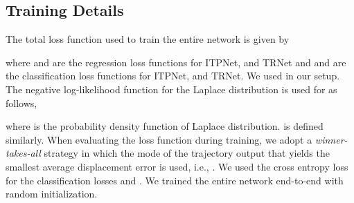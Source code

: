 \documentclass[10pt,twocolumn,letterpaper]{article}
\begin{document}
\subsection{Training Details}

The total  loss function  used to train the entire network is given by  

where  and  are the regression loss functions for ITPNet, and TRNet and  and  are the classification loss functions for ITPNet, and TRNet.   We used  in our setup. The negative log-likelihood function for the Laplace distribution is used for  as follows,

 where   is the probability density function of Laplace distribution.  is defined similarly. When evaluating the loss function during training, we adopt a {\it winner-takes-all} strategy \cite{MTP} in which the mode  of the trajectory output that yields the smallest average displacement error is used, i.e.,  . We used the cross entropy loss for the classification losses  and . 
 We trained the entire network end-to-end with random initialization.

\begin{table}[ht]
    \centering
    \vspace{0pt}
    \caption{Performance comparison on {\it nuScenes validation set} in the official leaderboard. The "-" symbol means the corresponding metric unknown. Our model achieves state-of-the-art performance on all metrics.}
        \label{nuscene result}
\end{table}
\end{document}
